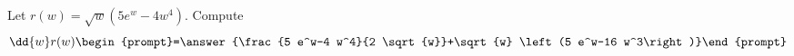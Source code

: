 \documentclass{ximera}
\author{Bart Snapp}
\begin{document}
\begin{exercise}
Let $r(w) = \sqrt{w} \left(5 e^w-4 w^4\right)$. Compute
\[
\dd{w}r(w)
\begin{prompt}=\answer{\frac{5 e^w-4 w^4}{2 \sqrt{w}}+\sqrt{w} \left(5 e^w-16 w^3\right)}\end{prompt}
\]
\end{exercise}
\end{document}
